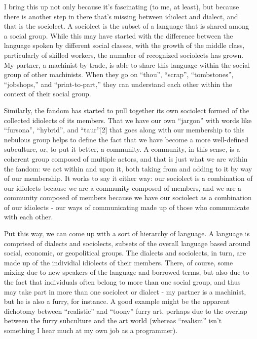 I bring this up not only because it's fascinating (to me, at least), but because there is another step in there that's missing between idiolect and dialect, and that is the sociolect. A sociolect is the subset of a language that is shared among a social group. While this may have started with the difference between the language spoken by different social classes, with the growth of the middle class, particularly of skilled workers, the numnber of recognized sociolects has grown. My partner, a machinist by trade, is able to share this language within the social group of other machinists. When they go on ``thou'', ``scrap'', ``tombstones'', ``jobshops,'' and ``print-to-part,'' they can understand each other within the context of their social group.

Similarly, the fandom has started to pull together its own sociolect formed of the collected idiolects of its members. That we have our own ``jargon'' with words like ``fursona'', ``hybrid'', and ``taur''{[}2{]} that goes along with our membership to this nebulous group helps to define the fact that we have become a more well-defined subculture, or, to put it better, a community. A community, in this sense, is a coherent group composed of multiple actors, and that is just what we are within the fandom: we act within and upon it, both taking from and adding to it by way of our membership. It works to say it either way: our sociolect is a combination of our idiolects because we are a community composed of members, and we are a community composed of members because we have our sociolect as a combination of our idiolects - our ways of communicating made up of those who communicate with each other.

Put this way, we can come up with a sort of hierarchy of language. A language is comprised of dialects and sociolects, subsets of the overall language based around social, economic, or geopolitical groups. The dialects and sociolects, in turn, are made up of the individial idiolects of their members. There, of course, some mixing due to new speakers of the language and borrowed terms, but also due to the fact that individuals often belong to more than one social group, and thus may take part in more than one sociolect or dialect - my partner is a machinist, but he is also a furry, for instance. A good example might be the apparent dichotomy between ``realistic'' and ``toony'' furry art, perhaps due to the overlap between the furry subculture and the art world (whereas ``realism'' isn't something I hear much at my own job as a programmer).

